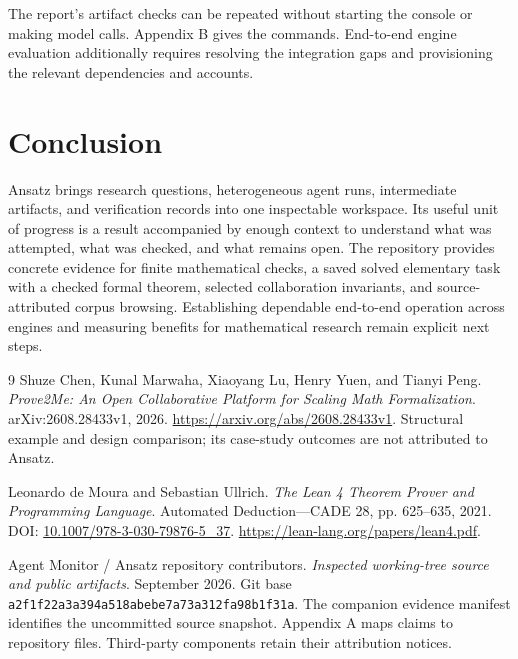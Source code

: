 \documentclass[10pt,letterpaper]{article}
\begin{document}
The report's artifact checks can be repeated without starting the console or making model calls. Appendix B gives the commands. End-to-end engine evaluation additionally requires resolving the integration gaps and provisioning the relevant dependencies and accounts.

\section{Conclusion}

Ansatz brings research questions, heterogeneous agent runs, intermediate artifacts, and verification records into one inspectable workspace. Its useful unit of progress is a result accompanied by enough context to understand what was attempted, what was checked, and what remains open. The repository provides concrete evidence for finite mathematical checks, a saved solved elementary task with a checked formal theorem, selected collaboration invariants, and source-attributed corpus browsing. Establishing dependable end-to-end operation across engines and measuring benefits for mathematical research remain explicit next steps.


\begin{thebibliography}{9}
Shuze Chen, Kunal Marwaha, Xiaoyang Lu, Henry Yuen, and Tianyi Peng.
\newblock \emph{Prove2Me: An Open Collaborative Platform for Scaling Math Formalization}.
\newblock arXiv:2608.28433v1, 2026.
\newblock \url{https://arxiv.org/abs/2608.28433v1}.
\newblock Structural example and design comparison; its case-study outcomes
are not attributed to Ansatz.

Leonardo de Moura and Sebastian Ullrich.
\newblock \emph{The Lean 4 Theorem Prover and Programming Language}.
\newblock Automated Deduction---CADE 28, pp. 625--635, 2021.
\newblock DOI: \href{https://doi.org/10.1007/978-3-030-79876-5_37}
{10.1007/978-3-030-79876-5\_37}.
\newblock \url{https://lean-lang.org/papers/lean4.pdf}.

Agent Monitor / Ansatz repository contributors.
\newblock \emph{Inspected working-tree source and public artifacts}.
 September 2026. Git base
\nolinkurl{a2f1f22a3a394a518abebe7a73a312fa98b1f31a}.
\newblock The companion evidence manifest identifies the uncommitted source
snapshot. Appendix A maps claims to repository files.
Third-party components retain their attribution notices.
\end{thebibliography}


\clearpage
\end{document}
